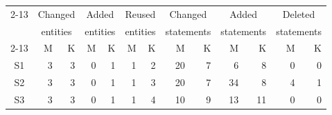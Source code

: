\begin{tabular}{|c|rr|rr|rr|rr|rr|rr|}
\cmidrule{2-13}
\multicolumn{1}{c|}{} & \multicolumn{2}{c|}{Changed} & \multicolumn{2}{c|}{Added} & \multicolumn{2}{c|}{Reused} & \multicolumn{2}{c|}{Changed} & \multicolumn{2}{c|}{Added} & \multicolumn{2}{c|}{Deleted} \\
\multicolumn{1}{c|}{} & \multicolumn{2}{c|}{entities} & \multicolumn{2}{c|}{entities} & \multicolumn{2}{c|}{entities} & \multicolumn{2}{c|}{statements} & \multicolumn{2}{c|}{statements} & \multicolumn{2}{c|}{statements} \\
\cmidrule{2-13}
\multicolumn{1}{c|}{} & M & K & M & K & M & K & M & K & M & K & M & K \\
\hline
S1\tnote{a} & 3 & 3 & 0 & 1 & 1 & 2 & 20 & 7 & 6 & 8 & 0 & 0 \\
\hline
S2\tnote{b} & 3 & 3 & 0 & 1 & 1 & 3 & 20 & 7 & 34 & 8 & 4 & 1 \\
\hline
S3\tnote{c} & 3 & 3 & 0 & 1 & 1 & 4 & 10 & 9 & 13 & 11 & 0 & 0 \\
\hline
\end{tabular}
